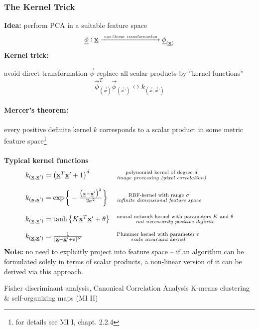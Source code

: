 \subsubsection{The Kernel Trick}
\textbf{Idea:} perform PCA in a suitable feature space
\begin{equation}
	\vec{\phi}: \vec{x} \xrightarrow{\text{ {\tiny non-linear 
		transformation}}} \vec{\phi}_{(\vec{x})}
\end{equation}
\textbf{Kernel trick:}
\begin{itemize}
	\itR avoid direct transformation $\vec{\phi}$
	\itR replace all scalar products by ''kernel functions''
		\begin{equation}
			\vec{\phi}_{(\vec{x})}^T
			\vec{\phi}_{(\vec{x}')} \longleftrightarrow 
			k_{(\vec{x}, \vec{x}')}
		\end{equation}
\end{itemize}

\paragraph{Mercer's theorem:} 
every positive definite kernel $k$ corresponds to a scalar product in 
some metric feature space\footnote{for details see MI I, chapt. 2.2.4} 
\\\\
{\bf Typical kernel functions}
\[ \begin{array}{ll}
	k_{(\vec{x},\vec{x}')} = \big( \vec{x}^T \vec{x}' + 1 \big)^d
	& \substack{	\text{polynomial kernel of degree } d \\
			\text{{\it image processing (pixel correlation)}} } \\\\
	k_{(\vec{x},\vec{x}')} = \exp \bigg\{ -\frac{ \big( \vec{x} - \vec{x}' 
					\big)^2 }{ 2 \sigma^2 } \bigg\}
	& \substack{ 	\text{RBF-kernel with range } \sigma \\
			\text{{\it infinite dimensional feature space}} } \\\\
	k_{(\vec{x},\vec{x}')} = \tanh \big\{ K \vec{x}^T \vec{x}' + \theta
					\big\}
	& \substack{ 	\text{neural network kernel with parameters } K 
				\text{ and } \theta \\
			\text{{\it not necessarily positive definite}} } \\\\
	k_{(\vec{x},\vec{x}')} = \frac{1}{ |\vec{x} - \vec{x}' + \varepsilon
						|^N }
	& \substack{	\text{Plummer kernel with parameter } \varepsilon \\
			\text{{\it scale invariant kernel}} }
\end{array} \]
\textbf{Note:} no need to explicitly project into feature space -- if
an algorithm can be formulated solely in terms of scalar products, a
non-linear version of it can be derived via this approach. 
\begin{itemize}
	\itl Fisher discriminant analysis, Canonical Correlation Analysis
	\itl K-means clustering \& self-organizing maps (MI II)
\end{itemize}

